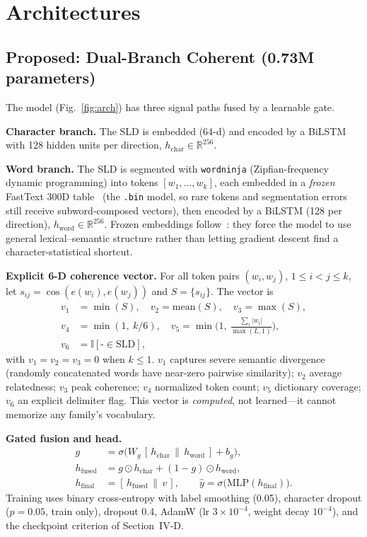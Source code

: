 \documentclass[conference]{IEEEtran}
\begin{document}
\section{Architectures}
\subsection{Proposed: Dual-Branch Coherent (0.73M parameters)}
The model (Fig.~\ref{fig:arch}) has three signal paths fused by a learnable gate.

\textbf{Character branch.} The SLD is embedded (64-d) and encoded by a BiLSTM with 128 hidden units per direction, $h_{\text{char}} \in \mathbb{R}^{256}$.

\textbf{Word branch.} The SLD is segmented with \texttt{wordninja} (Zipfian-frequency dynamic programming) into tokens $[w_1,\dots,w_k]$, each embedded in a \emph{frozen} FastText 300D table~\cite{bojanowski2017} (the \texttt{.bin} model, so rare tokens and segmentation errors still receive subword-composed vectors), then encoded by a BiLSTM (128 per direction), $h_{\text{word}} \in \mathbb{R}^{256}$. Frozen embeddings follow~\cite{koh2018}: they force the model to use general lexical--semantic structure rather than letting gradient descent find a character-statistical shortcut.

\textbf{Explicit 6-D coherence vector.} For all token pairs $(w_i, w_j)$, $1 \le i < j \le k$, let $s_{ij} = \cos(e(w_i), e(w_j))$ and $S = \{s_{ij}\}$. The vector is
\begin{align}
v_1 &= \min(S), \quad v_2 = \mathrm{mean}(S), \quad v_3 = \max(S), \\
v_4 &= \min(1,\ k/6), \quad
v_5 = \min\!\Big(1,\ \tfrac{\sum_i |w_i|}{\max(L,1)}\Big), \\
v_6 &= \mathbb{I}[\texttt{-} \in \mathrm{SLD}],
\end{align}
with $v_1{=}v_2{=}v_3{=}0$ when $k \le 1$. $v_1$ captures severe semantic divergence (randomly concatenated words have near-zero pairwise similarity); $v_2$ average relatedness; $v_3$ peak coherence; $v_4$ normalized token count; $v_5$ dictionary coverage; $v_6$ an explicit delimiter flag. This vector is \emph{computed}, not learned---it cannot memorize any family's vocabulary.

\textbf{Gated fusion and head.}
\begin{align}
g &= \sigma\!\big(W_g\,[\,h_{\text{char}} \,\|\, h_{\text{word}}\,] + b_g\big), \\
h_{\text{fused}} &= g \odot h_{\text{char}} + (1-g) \odot h_{\text{word}}, \\
h_{\text{final}} &= [\,h_{\text{fused}} \,\|\, v\,], \qquad
\hat{y} = \sigma\!\big(\mathrm{MLP}(h_{\text{final}})\big).
\end{align}
Training uses binary cross-entropy with label smoothing (0.05), character dropout ($p{=}0.05$, train only), dropout 0.4, AdamW (lr $3{\times}10^{-4}$, weight decay $10^{-4}$), and the checkpoint criterion of Section~IV-D.
\end{document}
